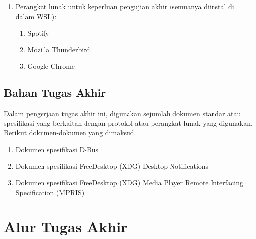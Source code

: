 \begin{enumerate}
    \item Perangkat lunak untuk keperluan pengujian akhir (semuanya diinstal di dalam WSL):
    \begin{enumerate}
        \item Spotify
        \item Mozilla Thunderbird
        \item Google Chrome
    \end{enumerate}
\end{enumerate}

\subsection{Bahan Tugas Akhir}

Dalam pengerjaan tugas akhir ini, digunakan sejumlah dokumen standar atau spesifikasi yang berkaitan dengan protokol atau perangkat lunak yang digunakan. Berikut dokumen-dokumen yang dimaksud.
\begin{enumerate}
    \item Dokumen spesifikasi D-Bus \cite{dbus-specification}
    \item Dokumen spesifikasi FreeDesktop (XDG) Desktop Notifications \cite{xdg-desktop-notifications-specification}
    \item Dokumen spesifikasi FreeDesktop (XDG) Media Player Remote Interfacing Specification (MPRIS) \cite{xdg-mpris-specification}
\end{enumerate}

\section{Alur Tugas Akhir}

